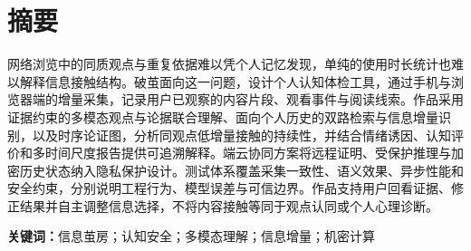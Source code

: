 \documentclass{setting/cgscic}
\begin{document}
\songti{}\linespread{1.5}\selectfont
\frontmatter
\makecover
\makeinstructions
\tableofcontents
\mainmatter
\nocite{ref1,ref2,ref3,ref4,ref5,ref6,ref7,ref8,ref9,ref10,ref11,ref12,ref13,ref14,ref15,ref16,ref17,ref18,ref19,ref20,ref21,ref22,ref23,ref24,ref25,ref26,ref27,ref28,ref29,ref30,ref31,ref32,ref33,ref34,ref35,ref36,ref37}
\section*{摘要}
网络浏览中的同质观点与重复依据难以凭个人记忆发现，单纯的使用时长统计也难以解释信息接触结构。破茧面向这一问题，设计个人认知体检工具，通过手机与浏览器端的增量采集，记录用户已观察的内容片段、观看事件与阅读线索。作品采用证据约束的多模态观点与论据联合理解、面向个人历史的双路检索与信息增量识别，以及时序论证图，分析同观点低增量接触的持续性，并结合情绪诱因、认知评价和多时间尺度报告提供可追溯解释。端云协同方案将远程证明、受保护推理与加密历史状态纳入隐私保护设计。测试体系覆盖采集一致性、语义效果、异步性能和安全约束，分别说明工程行为、模型误差与可信边界。作品支持用户回看证据、修正结果并自主调整信息选择，不将内容接触等同于观点认同或个人心理诊断。
\par\medskip\noindent\textbf{关键词：}信息茧房；认知安全；多模态理解；信息增量；机密计算





\FloatBarrier


\cgscLastPage
\end{document}
